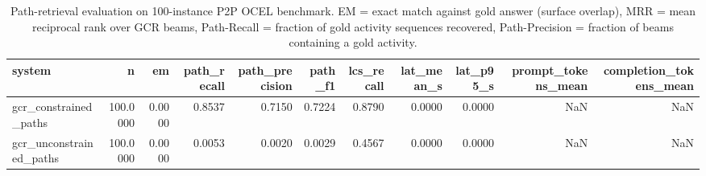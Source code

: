 \begin{table}
\caption{Path-retrieval evaluation on 100-instance P2P OCEL benchmark. EM = exact match against gold answer (surface overlap), MRR = mean reciprocal rank over GCR beams, Path-Recall = fraction of gold activity sequences recovered, Path-Precision = fraction of beams containing a gold activity.}
\label{tab:path_results}
\begin{tabular}{lrrrrrrrrrr}
\toprule
system & n & em & path_recall & path_precision & path_f1 & lcs_recall & lat_mean_s & lat_p95_s & prompt_tokens_mean & completion_tokens_mean \\
\midrule
gcr_constrained_paths & 100.0000 & 0.0000 & 0.8537 & 0.7150 & 0.7224 & 0.8790 & 0.0000 & 0.0000 & NaN & NaN \\
gcr_unconstrained_paths & 100.0000 & 0.0000 & 0.0053 & 0.0020 & 0.0029 & 0.4567 & 0.0000 & 0.0000 & NaN & NaN \\
\bottomrule
\end{tabular}
\end{table}
